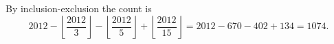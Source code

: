 By inclusion-exclusion the count is
\[
2012-\left\lfloor\dfrac{2012}{3}\right\rfloor-\left\lfloor\dfrac{2012}{5}\right\rfloor+\left\lfloor\dfrac{2012}{15}\right\rfloor
=2012-670-402+134=\boxed{1074}.
\]
